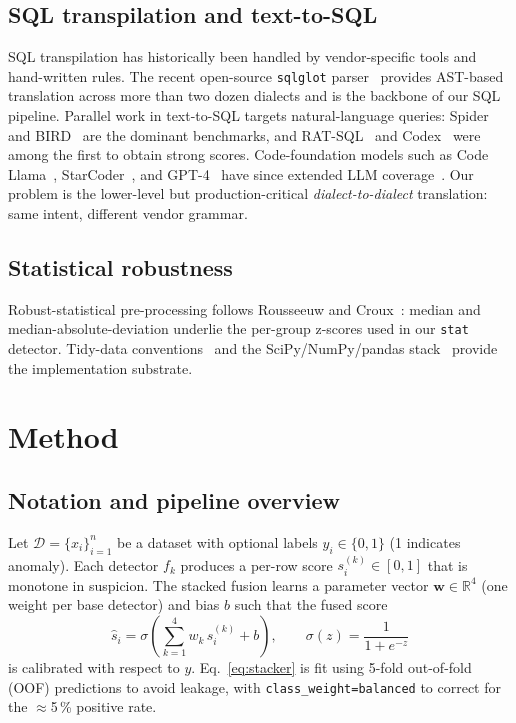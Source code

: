 \documentclass{ieeeaccess}
\begin{document}
\subsection{SQL transpilation and text-to-SQL}
SQL transpilation has historically been handled by vendor-specific tools and hand-written rules. The recent
open-source \texttt{sqlglot} parser~\cite{sqlglot2024} provides AST-based translation across more than two
dozen dialects and is the backbone of our SQL pipeline. Parallel work in text-to-SQL targets natural-language
queries: Spider~\cite{yu2018spider} and BIRD~\cite{li2024can} are the dominant benchmarks, and
RAT-SQL~\cite{wang2020rat} and Codex~\cite{chen2021evaluating} were among the first to obtain strong scores.
Code-foundation models such as Code Llama~\cite{rozière2024code}, StarCoder~\cite{li2023starcoder}, and
GPT-4~\cite{achiam2023gpt4} have since extended LLM coverage~\cite{rajkumar2022evaluating,srivastava2024gpt4sql}.
Our problem is the lower-level but production-critical \emph{dialect-to-dialect} translation: same intent,
different vendor grammar.

\subsection{Statistical robustness}
Robust-statistical pre-processing follows Rousseeuw and Croux~\cite{rousseeuw1993alternatives}: median and
median-absolute-deviation underlie the per-group z-scores used in our \texttt{stat} detector. Tidy-data
conventions~\cite{wickham2014tidy} and the SciPy/NumPy/pandas
stack~\cite{pedregosa2011scikit,harris2020array,mckinney2010data} provide the implementation substrate.

\section{Method}
\label{sec:method}

\subsection{Notation and pipeline overview}
Let $\mathcal{D}=\{x_i\}_{i=1}^{n}$ be a dataset with optional labels $y_i\in\{0,1\}$ (1 indicates anomaly).
Each detector $f_k$ produces a per-row score $s_i^{(k)}\in[0,1]$ that is monotone in suspicion. The stacked
fusion learns a parameter vector $\mathbf{w}\in\mathbb{R}^4$ (one weight per base detector) and bias $b$ such
that the fused score
\begin{equation}
\hat{s}_i = \sigma\!\left(\sum_{k=1}^{4} w_k\,s_i^{(k)} + b\right),\qquad
\sigma(z)=\frac{1}{1+e^{-z}}
\label{eq:stacker}
\end{equation}
is calibrated with respect to $y$. Eq.~\ref{eq:stacker} is fit using 5-fold out-of-fold (OOF) predictions
to avoid leakage, with \texttt{class\_weight=balanced} to correct for the $\approx$5\,\% positive rate.
\end{document}
